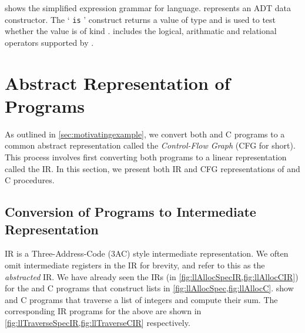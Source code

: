  shows the simplified expression grammar for \SpecL{} language.
 represents an ADT data constructor.
The ` {\tt is} ' construct returns a value of  type and is used to test whether
the value  is of kind .
 includes the logical, arithmatic and relational operators supported by \SpecL{}.

\section{Abstract Representation of Programs}
\label{sec:ir}
As outlined in \cref{sec:motivatingexample}, we convert both \SpecL{} and C programs to a common
abstract representation called the {\em Control-Flow Graph} (CFG for short).
This process involves first converting both programs to a linear representation called the IR.
In this section, we present both IR and CFG representations of \SpecL{} and C procedures.

\subsection{Conversion of Programs to Intermediate Representation}
\label{sec:irconv}
IR is a Three-Address-Code (3AC) style intermediate representation.
We often omit intermediate registers in the IR for brevity, and refer to this as the {\em abstracted} IR.
We have already seen the IRs (in \cref{fig:llAllocSpecIR,fig:llAllocCIR}) for the \SpecL{} and C programs
that construct lists in \cref{fig:llAllocSpec,fig:llAllocC}.
 show \SpecL{} and C programs that traverse a list of integers
and compute their sum.
The corresponding IR programs for the above are shown in \cref{fig:llTraverseSpecIR,fig:llTraverseCIR} respectively.

